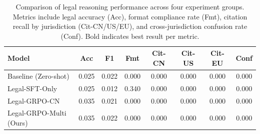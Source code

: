 \begin{table}[t]
\centering
\caption{Comparison of legal reasoning performance across four experiment groups. Metrics include legal accuracy (Acc), format compliance rate (Fmt), citation recall by jurisdiction (Cit-CN/US/EU), and cross-jurisdiction confusion rate (Conf). Bold indicates best result per metric.}
\label{tab:comparison}
\small
\begin{tabular}{lccccccc}
\toprule
Model & Acc & F1 & Fmt & Cit-CN & Cit-US & Cit-EU & Conf \\
\midrule
    Baseline (Zero-shot) & 0.025 & 0.022 & 0.000 & 0.000 & 0.000 & 0.000 & 0.000 \\
    Legal-SFT-Only & 0.025 & 0.012 & 0.340 & 0.000 & 0.000 & 0.000 & 0.000 \\
    Legal-GRPO-CN & 0.035 & 0.021 & 0.000 & 0.000 & 0.000 & 0.000 & 0.000 \\
    Legal-GRPO-Multi (Ours) & 0.035 & 0.022 & 0.000 & 0.000 & 0.000 & 0.000 & 0.000 \\
\bottomrule
\end{tabular}
\end{table}